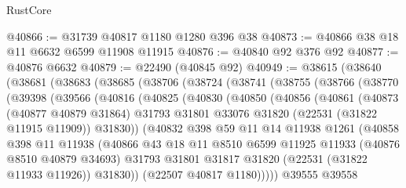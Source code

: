 \begin{lexlean}{RustCore}
\begin{coremodule}
@40866 := @31739 @40817 @1180 @1280 @396 @38
@40873 := @40866 @38 @18 @11 @6632 @6599 @11908 @11915
@40876 := @40840 @92 @376 @92
@40877 := @40876 @6632
@40879 := @22490 (@40845 @92)
@40949 := @38615
    (@38640
      (@38681
        (@38683
          (@38685
            (@38706
              (@38724
                (@38741
                  (@38755
                    (@38766
                      (@38770
                        (@39398
                          (@39566
                            (@40816
                              (@40825
                                (@40830
                                  (@40850
                                    (@40856
                                      (@40861
                                        (@40873
                                          (@40877 @40879 @31864)
                                          @31793
                                          @31801
                                          @33076
                                          @31820
                                          (@22531 (@31822 @11915 @11909))
                                          @31830))
                                      (@40832
                                        @398
                                        @59
                                        @11
                                        @14
                                        @11938
                                        @1261
                                        (@40858
                                          @398
                                          @11
                                          @11938
                                          (@40866
                                            @43
                                            @18
                                            @11
                                            @8510
                                            @6599
                                            @11925
                                            @11933
                                            (@40876 @8510 @40879 @34693)
                                            @31793
                                            @31801
                                            @31817
                                            @31820
                                            (@22531 (@31822 @11933 @11926))
                                            @31830))
                                        (@22507 @40817 @1180)))))
                                @39555
                                @39558

\end{coremodule}
\end{lexlean}
